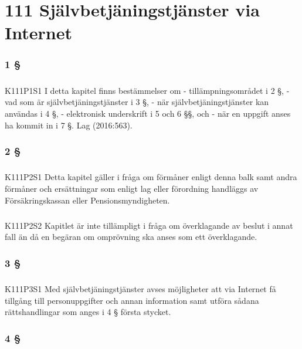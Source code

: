 \documentclass[a4paper,notitlepage,openany,10pt]{book}
\begin{document}
\chapter*{111 Självbetjäningstjänster via Internet}
\subsection*{1 §}
\paragraph*{}
{\tiny K111P1S1}
I detta kapitel finns bestämmelser om
\newline - tillämpningsområdet i 2 §,
\newline - vad som är självbetjäningstjänster i 3 §,
\newline - när självbetjäningstjänster kan användas i 4 §,
\newline - elektronisk underskrift i 5 och 6 §§, och
\newline - när en uppgift anses ha kommit in i 7 §.
Lag (2016:563).
\subsection*{2 §}
\paragraph*{}
{\tiny K111P2S1}
Detta kapitel gäller i fråga om förmåner enligt denna balk samt andra förmåner och ersättningar som enligt lag eller förordning handläggs av Försäkringskassan eller Pensionsmyndigheten.
\paragraph*{}
{\tiny K111P2S2}
Kapitlet är inte tillämpligt i fråga om överklagande av beslut i annat fall än då en begäran om omprövning ska anses som ett överklagande.
\subsection*{3 §}
\paragraph*{}
{\tiny K111P3S1}
Med självbetjäningstjänster avses möjligheter att via Internet få tillgång till personuppgifter och annan information samt utföra sådana rättshandlingar som anges i 4 § första stycket.
\subsection*{4 §}
\end{document}
